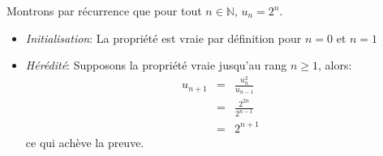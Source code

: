 Montrons par récurrence que pour tout $n\in\mathbb{N}$, $u_n=2^n$.
\begin{itemize}
  \item \textit{Initialisation}: La propriété est vraie par définition pour $n=0$ et $n=1$
  \item \textit{Hérédité}: Supposons la propriété vraie jusqu'au rang $n\geq 1$, alors:
  \begin{eqnarray*}
    u_{n+1} &=& \frac{u_n^2}{u_{n-1}} \\
    &=& \frac{2^{2n}}{2^{n-1}} \\
    &=& 2^{n+1}
  \end{eqnarray*}
  ce qui achève la preuve.
\end{itemize}
